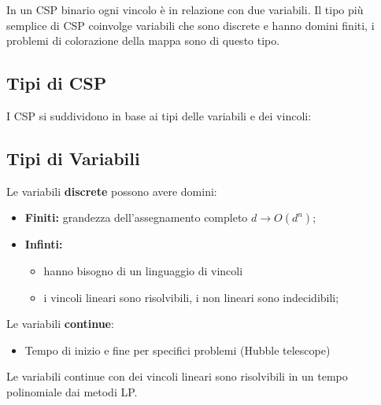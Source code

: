 \noindent In un CSP binario ogni vincolo è in relazione con due variabili. Il tipo più semplice di CSP coinvolge variabili che sono discrete e hanno domini finiti, i problemi di colorazione della mappa sono di questo tipo.

\subsection{Tipi di CSP}
I CSP si suddividono in base ai tipi delle variabili e dei vincoli:
\subsection{Tipi di Variabili}
Le variabili \textbf{discrete} possono avere domini:
\begin{itemize}
    \item \textbf{Finiti:} grandezza dell’assegnamento completo $d \rightarrow O(d^n)$;
    \item \textbf{Infinti:} 
    \begin{itemize}
        \item hanno bisogno di un linguaggio di vincoli
        \item i vincoli lineari sono risolvibili, i non lineari sono indecidibili;
    \end{itemize}
\end{itemize}
Le variabili \textbf{continue}:
\begin{itemize}
    \item Tempo di inizio e fine per specifici problemi (Hubble telescope)
\end{itemize}
Le variabili continue con dei vincoli lineari sono risolvibili in un tempo polinomiale
dai metodi LP.

